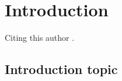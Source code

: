 \newpage
\section{Introduction}

\lipsum[5]
Citing this author \cite{Fleetwood_2017}.
\lipsum[5]

\lipsum[5]

\subsection{Introduction topic}

\lipsum[5]

\lipsum[5]